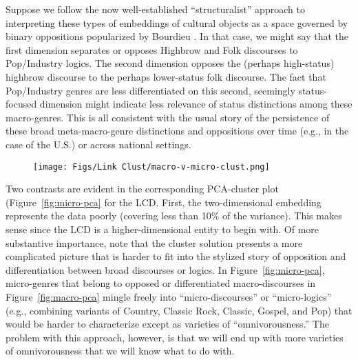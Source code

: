  Suppose we follow the now well-established ``structuralist'' approach to interpreting these types of embeddings of cultural objects as a space governed by binary oppositions popularized by Bourdieu \citeyearpar{bourdieu84}. In that case, we might say that the first dimension separates or opposes Highbrow and Folk discourses to Pop/Industry logics. The second dimension opposes the (perhaps high-status) highbrow discourse to the perhaps lower-status folk discourse. The fact that Pop/Industry genres are less differentiated on this second, seemingly status-focused dimension might indicate less relevance of status distinctions among these macro-genres. This is all consistent with the usual story of the persistence of these broad meta-macro-genre distinctions and oppositions over time (e.g., in the case of the U.S.) or across national settings. 

\begin{figure}[ht!]
    \texttt{[image: Figs/Link Clust/macro-v-micro-clust.png]}
    \caption{}
    \label{fig:macro-v-micro-cluster}
 \end{figure}
 
 Two contrasts are evident in the corresponding PCA-cluster plot (Figure~\ref{fig:micro-pca} for the LCD. First, the two-dimensional embedding represents the data poorly (covering less than 10\% of the variance). This makes sense since the LCD is a higher-dimensional entity to begin with. Of more substantive importance, note that the cluster solution presents a more complicated picture that is harder to fit into the stylized story of opposition and differentiation between broad discourses or logics. In Figure~\ref{fig:micro-pca}, micro-genres that belong to opposed or differentiated macro-discourses in Figure~\ref{fig:macro-pca} mingle freely into ``micro-discourses'' or ``micro-logics'' (e.g., combining variants of Country, Classic Rock, Classic, Gospel, and Pop) that would be harder to characterize except as varieties of ``omnivorousness.'' The problem with this approach, however, is that we will end up with more varieties of omnivorousness that we will know what to do with. 


